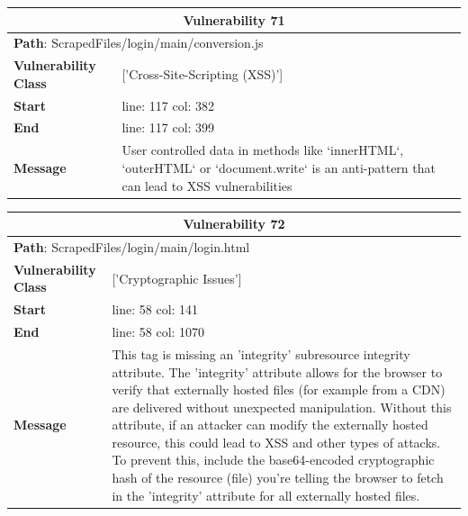 \documentclass[12pt]{article}
\begin{document}
\vspace{0.7cm}
\FloatBarrier
\begin{table}[!h]
\centering
\renewcommand{\arraystretch}{1.3}
\begin{tabular}{|l|p{10cm}|}
\hline
\multicolumn{2}{|c|}{\textbf{Vulnerability 71}} \\
\hline
\multicolumn{2}{|l|}{\textbf{Path}: ScrapedFiles/login/main/conversion.js} \\
\hline
\textbf{Vulnerability Class} & ['Cross-Site-Scripting (XSS)'] \\
\hline
\textbf{Start} & line: 117 \quad col: 382 \\
\hline
\textbf{End} & line: 117 \quad col: 399 \\
\hline
\textbf{Message} & User controlled data in methods like `innerHTML`, `outerHTML` or `document.write` is an anti-pattern that can lead to XSS vulnerabilities \\
\hline
\end{tabular}
\end{table}
\vspace{0.7cm}
\FloatBarrier
\begin{table}[!h]
\centering
\renewcommand{\arraystretch}{1.3}
\begin{tabular}{|l|p{10cm}|}
\hline
\multicolumn{2}{|c|}{\textbf{Vulnerability 72}} \\
\hline
\multicolumn{2}{|l|}{\textbf{Path}: ScrapedFiles/login/main/login.html} \\
\hline
\textbf{Vulnerability Class} & ['Cryptographic Issues'] \\
\hline
\textbf{Start} & line: 58 \quad col: 141 \\
\hline
\textbf{End} & line: 58 \quad col: 1070 \\
\hline
\textbf{Message} & This tag is missing an 'integrity' subresource integrity attribute. The 'integrity' attribute allows for the browser to verify that externally hosted files (for example from a CDN) are delivered without unexpected manipulation. Without this attribute, if an attacker can modify the externally hosted resource, this could lead to XSS and other types of attacks. To prevent this, include the base64-encoded cryptographic hash of the resource (file) you're telling the browser to fetch in the 'integrity' attribute for all externally hosted files. \\
\hline
\end{tabular}
\end{table}
\vspace{0.7cm}
\end{document}
